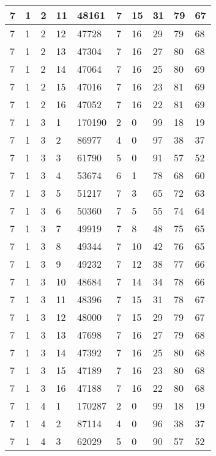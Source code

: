 \begin{table}[!ht]
\begin{tabular}{|l|l|l|l|l|l|l|l|l|l|}
        7 & 1 & 2 & 11 & 48161 & 7 & 15 & 31 & 79 & 67 \\ \hline
        7 & 1 & 2 & 12 & 47728 & 7 & 16 & 29 & 79 & 68 \\ \hline
        7 & 1 & 2 & 13 & 47304 & 7 & 16 & 27 & 80 & 68 \\ \hline
        7 & 1 & 2 & 14 & 47064 & 7 & 16 & 25 & 80 & 69 \\ \hline
        7 & 1 & 2 & 15 & 47016 & 7 & 16 & 23 & 81 & 69 \\ \hline
        7 & 1 & 2 & 16 & 47052 & 7 & 16 & 22 & 81 & 69 \\ \hline
        7 & 1 & 3 & 1 & 170190 & 2 & 0 & 99 & 18 & 19 \\ \hline
        7 & 1 & 3 & 2 & 86977 & 4 & 0 & 97 & 38 & 37 \\ \hline
        7 & 1 & 3 & 3 & 61790 & 5 & 0 & 91 & 57 & 52 \\ \hline
        7 & 1 & 3 & 4 & 53674 & 6 & 1 & 78 & 68 & 60 \\ \hline
        7 & 1 & 3 & 5 & 51217 & 7 & 3 & 65 & 72 & 63 \\ \hline
        7 & 1 & 3 & 6 & 50360 & 7 & 5 & 55 & 74 & 64 \\ \hline
        7 & 1 & 3 & 7 & 49919 & 7 & 8 & 48 & 75 & 65 \\ \hline
        7 & 1 & 3 & 8 & 49344 & 7 & 10 & 42 & 76 & 65 \\ \hline
        7 & 1 & 3 & 9 & 49232 & 7 & 12 & 38 & 77 & 66 \\ \hline
        7 & 1 & 3 & 10 & 48684 & 7 & 14 & 34 & 78 & 66 \\ \hline
        7 & 1 & 3 & 11 & 48396 & 7 & 15 & 31 & 78 & 67 \\ \hline
        7 & 1 & 3 & 12 & 48000 & 7 & 15 & 29 & 79 & 67 \\ \hline
        7 & 1 & 3 & 13 & 47698 & 7 & 16 & 27 & 79 & 68 \\ \hline
        7 & 1 & 3 & 14 & 47392 & 7 & 16 & 25 & 80 & 68 \\ \hline
        7 & 1 & 3 & 15 & 47189 & 7 & 16 & 23 & 80 & 68 \\ \hline
        7 & 1 & 3 & 16 & 47188 & 7 & 16 & 22 & 80 & 68 \\ \hline
        7 & 1 & 4 & 1 & 170287 & 2 & 0 & 99 & 18 & 19 \\ \hline
        7 & 1 & 4 & 2 & 87114 & 4 & 0 & 96 & 38 & 37 \\ \hline
        7 & 1 & 4 & 3 & 62029 & 5 & 0 & 90 & 57 & 52 \\ \hline

\end{tabular}
\end{table}
